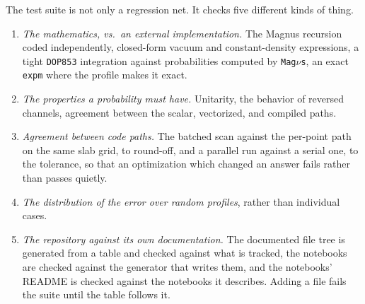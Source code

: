 \documentclass[final,5p,times,twocolumn,sort,compress]{elsarticle}
\makeatletter
\DeclareRobustCommand{\_}{%
  \ifmmode\nfss@text{\textunderscore}\else\textunderscore\allowbreak\fi}
\newcommand{\magnus}{{\tt Mag}\ensuremath{\nu}{\tt s}}
\makeatother
\begin{document}
The test suite is not only a regression net. It checks five different kinds of thing.
\begin{enumerate}
\item \emph{The mathematics, vs.~an external implementation.} The Magnus recursion coded independently, closed-form vacuum and constant-density expressions, a tight {\tt DOP853} integration against probabilities computed by \magnus, an exact {\tt expm} where the profile makes it exact.
\smallskip
\item \emph{The properties a probability must have.} Unitarity, the behavior of reversed channels, agreement between the scalar, vectorized, and compiled paths.
\smallskip
\item \emph{Agreement between code paths.} The batched scan against the per-point path on the same slab grid, to round-off, and a parallel run against a serial one, to the tolerance, so that an optimization which changed an answer fails rather than passes quietly.
\smallskip
\item \emph{The distribution of the error over random profiles}, rather than individual cases.
\smallskip
\item \emph{The repository against its own documentation.} The documented file tree is generated from a table and checked against what is tracked, the notebooks are checked against the generator that writes them, and the notebooks' README is checked against the notebooks it describes. Adding a file fails the suite until the table follows it.

\end{enumerate}

\end{document}
